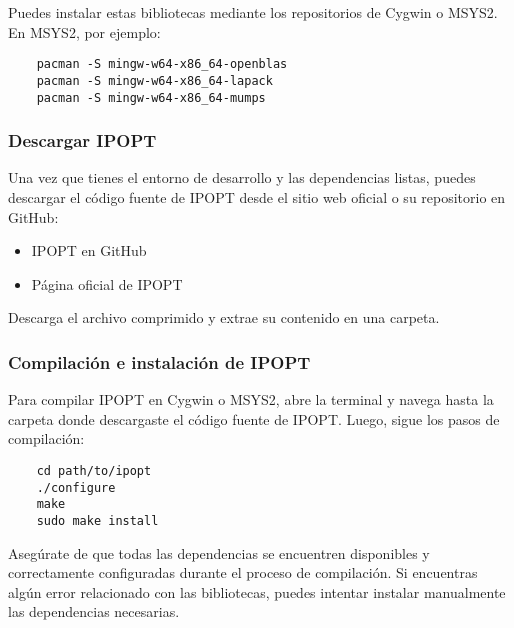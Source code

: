 \begin{flushleft}
	Puedes instalar estas bibliotecas mediante los repositorios de Cygwin o MSYS2. En MSYS2, por ejemplo:
\end{flushleft}

\begin{verbatim}
	pacman -S mingw-w64-x86_64-openblas
	pacman -S mingw-w64-x86_64-lapack
	pacman -S mingw-w64-x86_64-mumps
\end{verbatim}

\subsubsection{Descargar IPOPT}

\begin{flushleft}
	Una vez que tienes el entorno de desarrollo y las dependencias listas, puedes descargar el código fuente de IPOPT desde el sitio web oficial o su repositorio en GitHub:
\end{flushleft}

\begin{itemize}
	\item IPOPT en GitHub
	\item Página oficial de IPOPT
\end{itemize}

\begin{flushleft}
	Descarga el archivo comprimido y extrae su contenido en una carpeta.
\end{flushleft}

\subsubsection{Compilación e instalación de IPOPT}

\begin{flushleft}
	Para compilar IPOPT en Cygwin o MSYS2, abre la terminal y navega hasta la carpeta donde descargaste el código fuente de IPOPT. Luego, sigue los pasos de compilación:
\end{flushleft}

\begin{verbatim}
	cd path/to/ipopt
	./configure
	make
	sudo make install
\end{verbatim}

\begin{flushleft}
	Asegúrate de que todas las dependencias se encuentren disponibles y correctamente configuradas durante el proceso de compilación. Si encuentras algún error relacionado con las bibliotecas, puedes intentar instalar manualmente las dependencias necesarias.
\end{flushleft}

